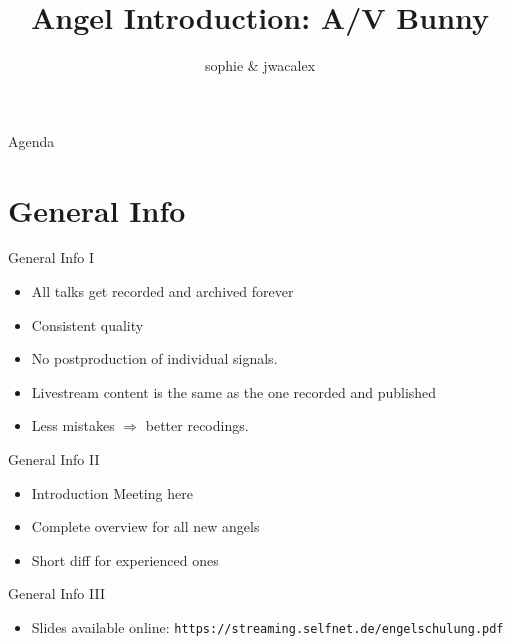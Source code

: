 \documentclass[aspectratio=169]{beamer}
\title{Angel Introduction: A/V Bunny}
\author{sophie \& jwacalex}
\institute{C3VOC}
\begin{document}
\maketitle


\begin{frame}{Agenda}
\tableofcontents
\end{frame}


\section{General Info}
\begin{frame}{General Info I}
	\begin{itemize}
		\item All talks get recorded and archived forever
		\item Consistent quality
		\item No postproduction of individual signals.
		\item Livestream content is the same as the one recorded and published
		\item Less mistakes $\Rightarrow$ better recodings.
	\end{itemize}
\end{frame}


\begin{frame}{General Info II}
	\begin{itemize}
		\item Introduction Meeting here
		\item Complete overview for all new angels
		\item Short diff for experienced ones
	\end{itemize}
\end{frame}

\begin{frame}{General Info III}
\begin{itemize}	
		\item Slides available online: \texttt{https://streaming.selfnet.de/engelschulung.pdf}
	\end{itemize}
	\begin{figure} 
		\centering
	\end{figure}
\end{frame}
\end{document}
